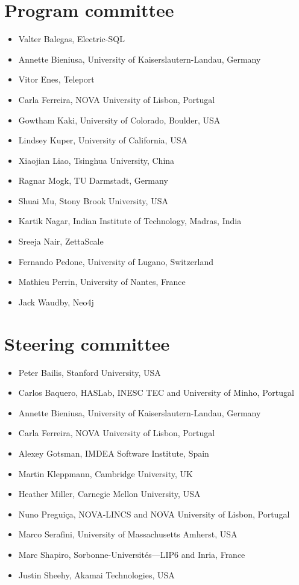 \documentclass[sigplan,review]{acmart}
\begin{document}
\section*{Program committee}

\begin{itemize}
\item Valter Balegas, Electric-SQL
\item Annette Bieniusa, University of Kaiserslautern-Landau, Germany
\item Vitor Enes, Teleport
\item Carla Ferreira, NOVA University of Lisbon, Portugal
\item Gowtham Kaki, University of Colorado, Boulder, USA
\item Lindsey Kuper, University of California, USA
\item Xiaojian Liao, Tsinghua University, China
\item Ragnar Mogk, TU Darmstadt, Germany
\item Shuai Mu, Stony Brook University, USA
\item Kartik Nagar, Indian Institute of Technology, Madras, India
\item Sreeja Nair, ZettaScale
\item Fernando Pedone, University of Lugano, Switzerland
\item Mathieu Perrin, University of Nantes, France
\item Jack Waudby, Neo4j
\end{itemize}

\section*{Steering committee}

\begin{itemize}
\item Peter Bailis, Stanford University, USA
\item Carlos Baquero, HASLab, INESC TEC and University of Minho, Portugal
\item Annette Bieniusa, University of Kaiserslautern-Landau, Germany
\item Carla Ferreira, NOVA University of Lisbon, Portugal
\item Alexey Gotsman, IMDEA Software Institute, Spain
\item Martin Kleppmann, Cambridge University, UK
\item Heather Miller, Carnegie Mellon University, USA
\item Nuno Preguiça, NOVA-LINCS and NOVA University of Lisbon, Portugal
\item Marco Serafini, University of Massachusetts Amherst, USA
\item Marc Shapiro, Sorbonne-Universités—LIP6 and Inria, France
\item Justin Sheehy, Akamai Technologies, USA
\end{itemize}
\end{document}
